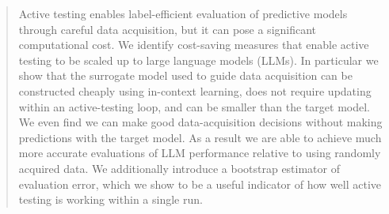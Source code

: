 \begin{abstract}
    Active testing enables label-efficient evaluation of predictive models through careful data acquisition, but it can pose a significant computational cost.
    We identify cost-saving measures that enable active testing to be scaled up to large language models (LLMs).
    In particular we show that the surrogate model used to guide data acquisition can be constructed cheaply using in-context learning, does not require updating within an active-testing loop, and can be smaller than the target model.
    We even find we can make good data-acquisition decisions without making predictions with the target model.
    As a result we are able to achieve much more accurate evaluations of LLM performance relative to using randomly acquired data.
    We additionally introduce a bootstrap estimator of evaluation error, which we show to be a useful indicator of how well active testing is working within a single run.
\end{abstract}